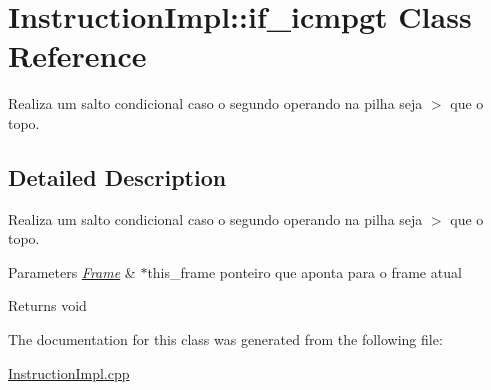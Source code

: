 \hypertarget{class_instruction_impl_1_1if__icmpgt}{}\section{Instruction\+Impl\+:\+:if\+\_\+icmpgt Class Reference}
\label{class_instruction_impl_1_1if__icmpgt}


Realiza um salto condicional caso o segundo operando na pilha seja $>$ que o topo.  




\subsection{Detailed Description}
Realiza um salto condicional caso o segundo operando na pilha seja $>$ que o topo. 


\begin{DoxyParams}{Parameters}
{\em \hyperlink{struct_frame}{Frame}} & $\ast$this\+\_\+frame ponteiro que aponta para o frame atual \\
\hline
\end{DoxyParams}
\begin{DoxyReturn}{Returns}
void 
\end{DoxyReturn}


The documentation for this class was generated from the following file\+:\begin{DoxyCompactItemize}
\item 
\hyperlink{_instruction_impl_8cpp}{Instruction\+Impl.\+cpp}\end{DoxyCompactItemize}
